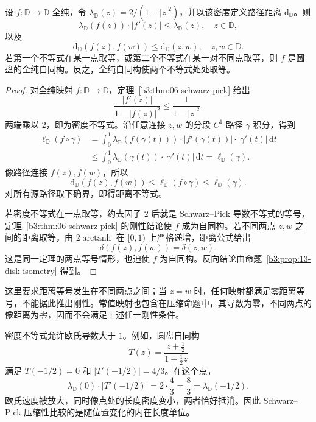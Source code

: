 \begin{proposition}\label{b3:prop:13-disk-contraction}
设 \(f:\mathbb D\to\mathbb D\) 全纯，令 \(\lambda_{\mathbb D}(z)=2/(1-|z|^2)\)，并以该密度定义路径距离 \(\mathrm d_{\mathbb D}\)。则
\[
 \lambda_{\mathbb D}(f(z))\cdot|f'(z)|
 \le\lambda_{\mathbb D}(z),
 \quad z\in\mathbb D,
\]
以及
\[
 \mathrm d_{\mathbb D}(f(z),f(w))
 \le\mathrm d_{\mathbb D}(z,w),
 \quad z,w\in\mathbb D.
\]
若第一个不等式在某一点取等，或第二个不等式在某一对不同点取等，则 \(f\) 是圆盘的全纯自同构。反之，全纯自同构使两个不等式处处取等。
\end{proposition}
\begin{proof}
对全纯映射 \(f:\mathbb D\to\mathbb D\)，定理~\ref{b3:thm:06-schwarz-pick} 给出
\[
 \frac{|f'(z)|}{1-|f(z)|^2}\le\frac{1}{1-|z|^2}.
\]
两端乘以 \(2\)，即为密度不等式。沿任意连接 \(z,w\) 的分段 \(C^1\) 路径 \(\gamma\) 积分，得到
\[
 \begin{aligned}
 \ell_{\mathbb D}(f\circ\gamma)
 &=\int_0^1\lambda_{\mathbb D}(f(\gamma(t)))
   \cdot|f'(\gamma(t))|\cdot|\gamma'(t)|\,\mathrm dt\\
 &\le\int_0^1\lambda_{\mathbb D}(\gamma(t))
   \cdot|\gamma'(t)|\,\mathrm dt
 =\ell_{\mathbb D}(\gamma).
 \end{aligned}
\]
像路径连接 \(f(z),f(w)\)，所以
\[
 \mathrm d_{\mathbb D}(f(z),f(w))
 \le\ell_{\mathbb D}(f\circ\gamma)
 \le\ell_{\mathbb D}(\gamma).
\]
对所有源路径取下确界，即得距离不等式。

若密度不等式在一点取等，约去因子 \(2\) 后就是 Schwarz--Pick 导数不等式的等号，定理~\ref{b3:thm:06-schwarz-pick} 的刚性结论使 \(f\) 成为自同构。若不同两点 \(z,w\) 之间的距离取等，由 \(2\operatorname{arctanh}\) 在 \([0,1)\) 上严格递增，距离公式给出
\[
 \delta(f(z),f(w))=\delta(z,w).
\]
这是同一定理的两点等号情形，也迫使 \(f\) 为自同构。反向结论由命题~\ref{b3:prop:13-disk-isometry} 得到。
\end{proof}

这里要求距离等号发生在不同两点之间；当 \(z=w\) 时，任何映射都满足零距离等号，不能据此推出刚性。常值映射也包含在压缩命题中，其导数为零，不同两点的像距离为零，因而不会满足上述任一刚性条件。

\ProseParagraphBreak
密度不等式允许欧氏导数大于 \(1\)。例如，圆盘自同构
\[
 T(z)=\frac{z+\frac12}{1+\frac12z}
\]
满足 \(T(-1/2)=0\) 和 \(|T'(-1/2)|=4/3\)。在这个点，
\[
 \lambda_{\mathbb D}(0)\cdot|T'(-1/2)|
 =2\cdot\frac43=\frac83
 =\lambda_{\mathbb D}(-1/2).
\]
欧氏速度被放大，同时像点处的长度密度变小，两者恰好抵消。因此 Schwarz--Pick 压缩性比较的是随位置变化的内在长度单位。
